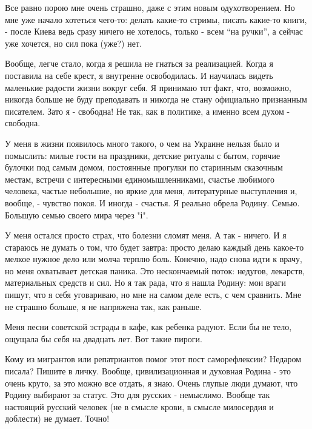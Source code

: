Все равно порою мне очень страшно, даже с этим новым одухотворением. Но мне уже
начало хотеться чего-то: делать какие-то стримы, писать какие-то книги, - после
Киева ведь сразу ничего не хотелось, только - всем \enquote{на ручки}, а сейчас уже
хочется, но сил пока (уже?) нет. 

Вообще, легче стало, когда я решила не гнаться за реализацией. Когда я
поставила на себе крест, я внутренне освободилась. И научилась видеть маленькие
радости жизни вокруг себя. Я принимаю тот факт, что, возможно, никогда больше
не буду преподавать и никогда не стану официально признанным писателем. Зато я
- свободна! Не так, как в политике, а именно всем духом - свободна.

У меня в жизни появилось много такого, о чем на Украине нельзя было и
помыслить: милые гости на праздники, детские ритуалы с бытом, горячие булочки
под самым домом, постоянные прогулки по старинным сказочным местам, встречи с
интересными единомышленниками, счастье любимого человека, частые небольшие, но
яркие для меня, литературные выступления и, вообще, - чувство покоя. И иногда -
счастья. Я реально обрела Родину. Семью. Большую семью своего мира через "і".

У меня остался просто страх, что болезни сломят меня. А так - ничего. И я
стараюсь не думать о том, что будет завтра: просто делаю каждый день какое-то
мелкое нужное дело или молча терплю боль. Конечно, надо снова идти к врачу, но
меня охватывает детская паника. Это нескончаемый поток: недугов, лекарств,
материальных средств и сил. Но я так рада, что я нашла Родину: мои враги пишут,
что я себя уговариваю, но мне на самом деле есть, с чем сравнить. Мне не
страшно больше, я не напряжена так, как раньше. 

Меня песни советской эстрады в кафе, как ребенка радуют. Если бы не тело,
ощущала бы себя на двадцать лет. Вот такие пироги. 

Кому из мигрантов или репатриантов помог этот пост саморефлексии? Недаром
писала? Пишите в личку. Вообще, цивилизационная и духовная Родина - это очень
круто, за это можно все отдать, я знаю. Очень глупые люди думают, что Родину
выбирают за статус. Это для русских - немыслимо. Вообще так настоящий русский
человек (не в смысле крови, в смысле милосердия и доблести) не думает. Точно!
